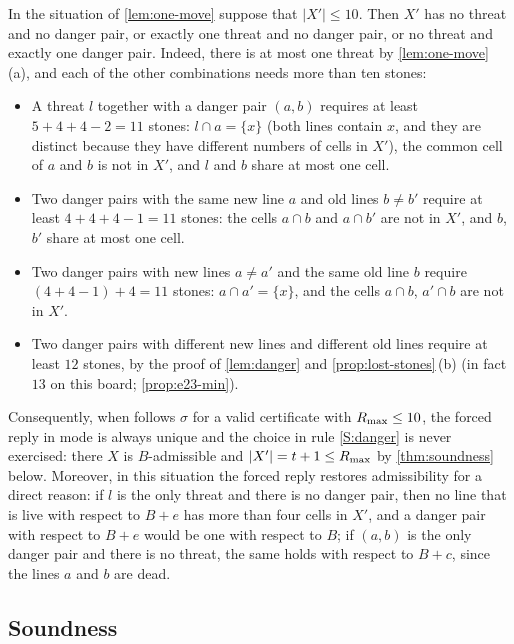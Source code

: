 \begin{remark}\label{rem:one-event}
In the situation of \cref{lem:one-move} suppose that $|X'|\le 10$. Then $X'$ has no threat and no danger
pair, or exactly one threat and no danger pair, or no threat and exactly one danger pair. Indeed, there is
at most one threat by \cref{lem:one-move}\,(a), and each of the other combinations needs more than ten
stones:
\begin{itemize}[leftmargin=2.2em]
\item A threat $l$ together with a danger pair $(a,b)$ requires at least $5+4+4-2=11$ stones: $l\cap a=\{x\}$
  (both lines contain $x$, and they are distinct because they have different numbers of cells in $X'$), the
  common cell of $a$ and $b$ is not in $X'$, and $l$ and $b$ share at most one cell.
\item Two danger pairs with the same new line $a$ and old lines $b\ne b'$ require at least $4+4+4-1=11$
  stones: the cells $a\cap b$ and $a\cap b'$ are not in $X'$, and $b$, $b'$ share at most one cell.
\item Two danger pairs with new lines $a\ne a'$ and the same old line $b$ require $(4+4-1)+4=11$ stones:
  $a\cap a'=\{x\}$, and the cells $a\cap b$, $a'\cap b$ are not in $X'$.
\item Two danger pairs with different new lines and different old lines require at least $12$ stones, by
  the proof of \cref{lem:danger} and \cref{prop:lost-stones}\,(b) (in fact $13$ on this board;
  \cref{prop:e23-min}).
\end{itemize}
Consequently, when \Breaker{} follows $\sigma$ for a valid certificate with $R_{\max}\le 10$, the forced reply
in \TABLE{} mode is always unique and the choice in rule \ref{S:danger} is never exercised: there $X$ is
$B$-admissible and $|X'|=t+1\le R_{\max}$ by \cref{thm:soundness} below. Moreover, in this situation the forced
reply restores admissibility for a direct reason: if $l$ is the only threat and there is no danger pair,
then no line that is live with respect to $B+e$ has more than four cells in $X'$, and a danger pair with
respect to $B+e$ would be one with respect to $B$; if $(a,b)$ is the only danger pair and there is no
threat, the same holds with respect to $B+c$, since the lines $a$ and $b$ are dead.
\end{remark}

\subsection{Soundness}\label{sec:soundness}

